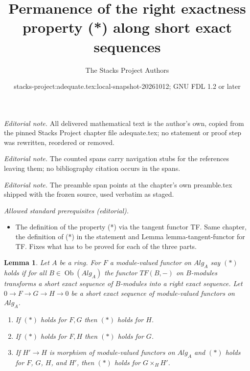 \documentclass{stacks-project}
\title{Permanence of the right exactness property (*) along short exact sequences}
\author{The Stacks Project Authors}
\date{stacks-project:adequate.tex:local-snapshot-20261012; GNU FDL 1.2 or later}
\theoremstyle{plain}
\newtheorem{lemma}[subsection]{Lemma}
\theoremstyle{definition}
\theoremstyle{remark}
\numberwithin{equation}{subsection}
\def\Ob{\mathop{\mathrm{Ob}}\nolimits}
\begin{document}
\maketitle
\noindent\textit{Editorial note.} All delivered mathematical text is the author's own, copied from the pinned Stacks Project chapter file adequate.tex; no statement or proof step was rewritten, reordered or removed.\par\medskip
\noindent\textit{Editorial note.} The counted spans carry navigation stubs for the references leaving them; no bibliography citation occurs in the spans.\par\medskip
\noindent\textit{Editorial note.} The preamble span points at the chapter's own preamble.tex shipped with the frozen source, used verbatim as staged.\par\medskip
\noindent\textit{Allowed standard prerequisites (editorial).}\begin{itemize}
\item The definition of the property (*) via the tangent functor TF. Same chapter, the definition of (*) in the statement and Lemma lemma-tangent-functor for TF. Fixes what has to be proved for each of the three parts.
\end{itemize}\medskip
\begin{lemma}
\label{lemma-exactness-permanence}
Let $A$ be a ring. For $F$ a module-valued functor on $\textit{Alg}_A$
say $(*)$ holds if for all $B \in \Ob(\textit{Alg}_A)$ the
functor $TF(B, -)$ on $B$-modules transforms a short exact sequence
of $B$-modules into a right exact sequence. Let
$0 \to F \to G \to H \to 0$ be a short exact sequence of
module-valued functors on $\textit{Alg}_A$.
\begin{enumerate}
\item If $(*)$ holds for $F, G$ then $(*)$ holds for $H$.
\item If $(*)$ holds for $F, H$ then $(*)$ holds for $G$.
\item If $H' \to H$ is morphism of module-valued functors on $\textit{Alg}_A$
and $(*)$ holds for $F$, $G$, $H$, and $H'$, then $(*)$ holds for
$G \times_H H'$.
\end{enumerate}
\end{lemma}
\end{document}
